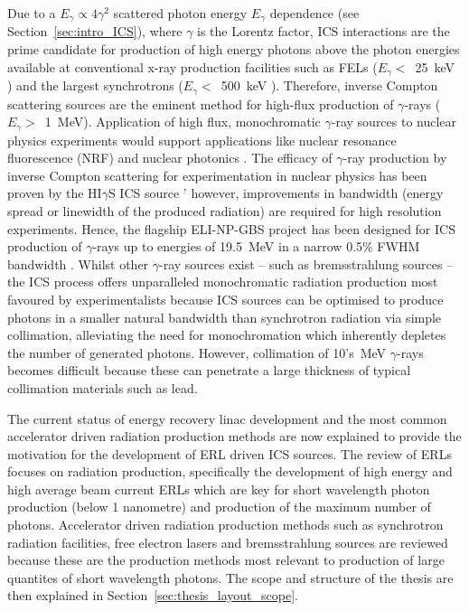 \documentclass[../main.tex]{subfiles}
\begin{document}
Due to a $E_{\gamma} \propto 4\gamma^{2}$ scattered photon energy $E_{\gamma}$ dependence (see Section~\ref{sec:intro_ICS}), where $\gamma$ is the Lorentz factor, ICS interactions are the prime candidate for production of high energy photons above the photon energies available at conventional x-ray production facilities such as FELs ($E_{\gamma} <$~25~keV \cite{schneidmiller2011photon}) and the largest synchrotrons ($E_{\gamma} <$~500~keV \cite{spring8beamlines}). Therefore, inverse Compton scattering sources are the eminent method for high-flux production of $\gamma$-rays ($E_{\gamma}>$~1~MeV). Application of high flux, monochromatic $\gamma$-ray sources to nuclear physics experiments would support applications like nuclear resonance fluorescence (NRF) \cite{hayakawa2010nondestructive} and nuclear photonics \cite{budker2021expanding}. The efficacy of $\gamma$-ray production by inverse Compton scattering for experimentation in nuclear physics has been proven by the HI$\gamma$S ICS source \cite{weller2009research}' however, improvements in bandwidth (energy spread or linewidth of the produced radiation) are required for high resolution experiments. Hence, the flagship ELI-NP-GBS project \cite{adriani2014technical,elinp2019vega,tanaka2020current} has been designed for ICS production of $\gamma$-rays up to energies of 19.5~\si{\mega\electronvolt} in a narrow 0.5\% FWHM bandwidth \cite{elinp2019vega}. Whilst other $\gamma$-ray sources exist -- such as bremsstrahlung sources -- the ICS process offers unparalleled monochromatic radiation production most favoured by experimentalists because ICS sources can be optimised to produce photons in a smaller natural bandwidth than synchrotron radiation via simple collimation, alleviating the need for monochromation which inherently depletes the number of generated photons. However, collimation of 10's~\si{\mega\electronvolt} $\gamma$-rays becomes difficult because these can penetrate a large thickness of typical collimation materials such as lead.  

The current status of energy recovery linac development and the most common accelerator driven radiation production methods are now explained to provide the motivation for the development of ERL driven ICS sources. The review of ERLs focuses on radiation production, specifically the development of high energy and high average beam current ERLs which are key for short wavelength photon production (below 1 nanometre) and production of the maximum number of photons. Accelerator driven radiation production methods such as synchrotron radiation facilities, free electron lasers and bremsstrahlung sources are reviewed because these are the production methods most relevant to production of large quantites of short wavelength photons. The scope and structure of the thesis are then explained in Section~\ref{sec:thesis_layout_scope}.    
\end{document}

